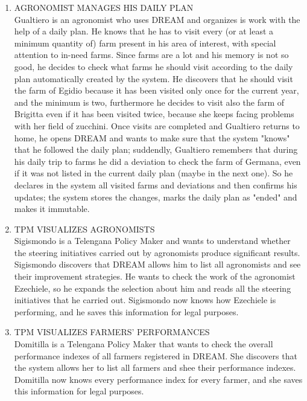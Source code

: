 \begin{enumerate}[label=\textbf{SCENARIO \arabic*}]
			\item \label{sce:sce6} AGRONOMIST MANAGES HIS DAILY PLAN \\
			Gualtiero is an agronomist who uses DREAM and organizes is work with the help of a daily plan. He knows that he has to visit every (or at least a minimum quantity of) farm present in his area of interest, with special attention to in-need farms. Since farms are a lot and his memory is not so good, he decides to check what farms he should visit according to the daily plan automatically created by the system. He discovers that he should visit the farm of Egidio because it has been visited only once for the current year, and the minimum is two, furthermore he decides to visit also the farm of Brigitta even if it has been visited twice, because she keeps facing problems with her field of zucchini. Once visits are completed and Gualtiero returns to home, he opens DREAM
			and wants to make sure that the system "knows" that he followed the daily plan; suddendly, Gualtiero remembers that during his daily trip to farms he did a deviation to check the farm of Germana, even if it was not listed in the current daily plan (maybe in the next one). So he declares in the system all visited farms and deviations and then confirms his updates; the system stores the changes, marks the daily plan as "ended" and makes it immutable.
			
			\item \label{sce:sce7} TPM VISUALIZES AGRONOMISTS \\
			Sigismondo is a Telengana Policy Maker and wants to understand whether the steering initiatives carried out by agronomists produce significant results. Sigismondo discovers that DREAM
			allows him to list all agronomists and see their improvement strategies. He wants to check the work of the agronomist Ezechiele, so he expands the selection about him and reads all
			the steering initiatives that he carried out. Sigismondo now knows how Ezechiele is performing, and he saves this information for legal purposes.
			
			\item \label{sce:sce8} TPM VISUALIZES FARMERS' PERFORMANCES \\
			Domitilla is a Telengana Policy Maker that wants to check the overall performance indexes of all farmers registered in DREAM. She discovers that the system allows her to list all farmers and shee their performance indexes. Domitilla now knows every performance index for every farmer, and she saves this information for legal purposes.
			

\end{enumerate}
